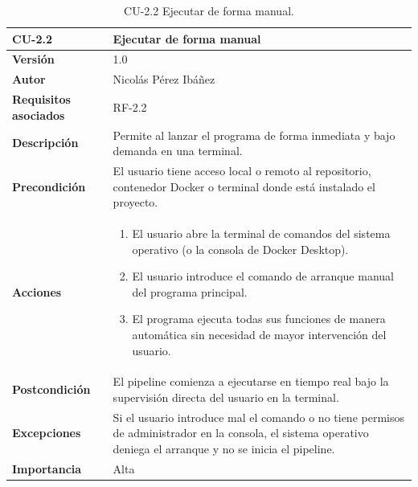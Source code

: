 \begin{table}[p]
	\centering
	\begin{tabularx}{\linewidth}{ p{} p{} }
		\toprule
		\textbf{CU-2.2}  & \textbf{Ejecutar de forma manual}\\
		\toprule
		\textbf{Versión}              & 1.0    \\
		\textbf{Autor}                & Nicolás Pérez Ibáñez \\
		\textbf{Requisitos asociados} & RF-2.2 \\
		\textbf{Descripción}          & Permite al lanzar el programa de forma inmediata y bajo demanda en una terminal. \\
		\textbf{Precondición}         & El usuario tiene acceso local o remoto al repositorio, contenedor Docker o terminal donde está instalado el proyecto. \\
		\textbf{Acciones}             &
		\begin{enumerate}
			\def\labelenumi{\arabic{enumi}.}
			\tightlist
			\item El usuario abre la terminal de comandos del sistema operativo (o la consola de Docker Desktop).
			\item El usuario introduce el comando de arranque manual del programa principal.
			\item El programa ejecuta todas sus funciones de manera automática sin necesidad de mayor intervención del usuario.
		\end{enumerate}\\
		\textbf{Postcondición}        & El pipeline comienza a ejecutarse en tiempo real bajo la supervisión directa del usuario en la terminal. \\
		\textbf{Excepciones}          & Si el usuario introduce mal el comando o no tiene permisos de administrador en la consola, el sistema operativo deniega el arranque y no se inicia el pipeline. \\
		\textbf{Importancia}          & Alta \\
		\bottomrule
	\end{tabularx}
	\caption{CU-2.2 Ejecutar de forma manual.}
\end{table}


